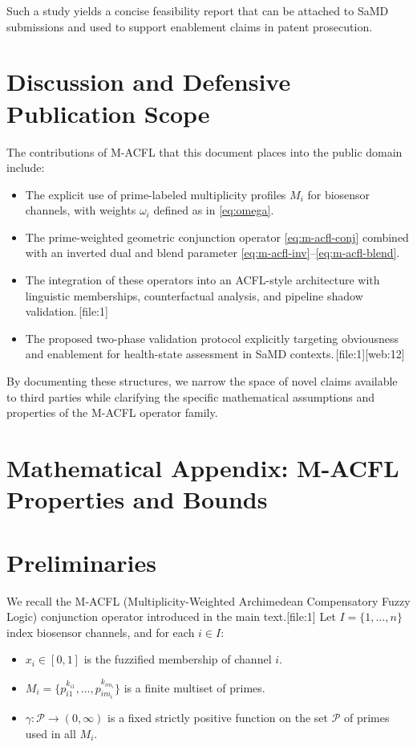 \documentclass[11pt]{article}
\begin{document}
Such a study yields a concise feasibility report that can be attached to SaMD submissions and used to support enablement claims in patent prosecution.

\section{Discussion and Defensive Publication Scope}

The contributions of M-ACFL that this document places into the public domain include:

\begin{itemize}
  \item The explicit use of prime-labeled multiplicity profiles $M_i$ for biosensor channels, with weights $\omega_i$ defined as in \eqref{eq:omega}.
  \item The prime-weighted geometric conjunction operator \eqref{eq:m-acfl-conj} combined with an inverted dual and blend parameter \eqref{eq:m-acfl-inv}--\eqref{eq:m-acfl-blend}.
  \item The integration of these operators into an ACFL-style architecture with linguistic memberships, counterfactual analysis, and pipeline shadow validation.\,[file:1]
  \item The proposed two-phase validation protocol explicitly targeting obviousness and enablement for health-state assessment in SaMD contexts.\,[file:1][web:12]
\end{itemize}

By documenting these structures, we narrow the space of novel claims available to third parties while clarifying the specific mathematical assumptions and properties of the M-ACFL operator family.

\appendix
\section*{Mathematical Appendix: M-ACFL Properties and Bounds}

\section{Preliminaries}

We recall the M-ACFL (Multiplicity-Weighted Archimedean Compensatory Fuzzy Logic) conjunction operator introduced in the main text.[file:1] 
Let $I = \{1,\dots,n\}$ index biosensor channels, and for each $i \in I$:

\begin{itemize}
  \item $x_i \in [0,1]$ is the fuzzified membership of channel $i$.
  \item $M_i = \{p_{i1}^{k_{i1}},\dots,p_{im_i}^{k_{im_i}}\}$ is a finite multiset of primes.
  \item $\gamma : \mathcal{P} \to (0,\infty)$ is a fixed strictly positive function on the set $\mathcal{P}$ of primes used in all $M_i$.
\end{itemize}
\end{document}
